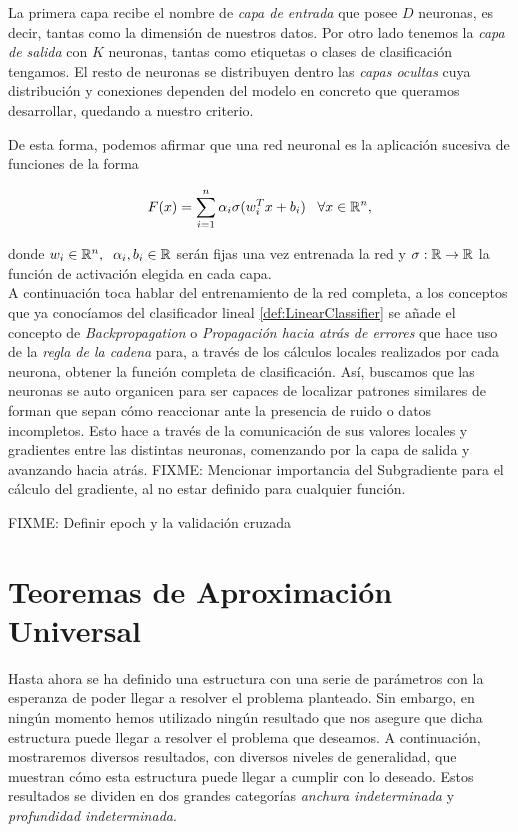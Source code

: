 La primera capa recibe el nombre de \emph{capa de entrada} que posee $D$ neuronas, es decir, tantas como la dimensión de nuestros datos. Por otro lado tenemos la \emph{capa de salida} con $K$ neuronas, tantas como etiquetas o clases de clasificación tengamos. El resto de neuronas se distribuyen dentro las \emph{capas ocultas} cuya distribución y conexiones dependen del modelo en concreto que queramos desarrollar, quedando a nuestro criterio.\newline

De esta forma, podemos afirmar que una red neuronal es la aplicación sucesiva de funciones de la forma

$$F(x)=\sum_{i=1}^n \alpha_i \sigma(w_i^Tx+b_i) \;\;\; \forall x \in \mathbb{R}^n,$$

donde $w_i\in\mathbb{R}^n,\;\; \alpha_i,b_i\in\mathbb{R}$ serán fijas una vez entrenada la red y $\sigma : \mathbb{R} \to \mathbb{R}$ la función de activación elegida en cada capa.\\

A continuación toca hablar del entrenamiento de la red completa, a los conceptos que ya conocíamos del clasificador lineal \ref{def:LinearClassifier} se añade el concepto de \emph{Backpropagation} o \emph{Propagación hacia atrás de errores} que hace uso de la \emph{regla de la cadena} para, a través de los cálculos locales realizados por cada neurona, obtener la función completa de clasificación. Así, buscamos que las neuronas se auto organicen para ser capaces de localizar patrones similares de forman que sepan cómo reaccionar ante la presencia de ruido o datos incompletos. Esto hace a través de la comunicación de sus valores locales y gradientes entre las distintas neuronas, comenzando por la capa de salida y avanzando hacia atrás. FIXME: Mencionar importancia del Subgradiente para el cálculo del gradiente, al no estar definido para cualquier función. \newline

FIXME: Definir epoch y la validación cruzada

\chapter{Teoremas de Aproximación Universal}
Hasta ahora se ha definido una estructura con una serie de parámetros con la esperanza de poder llegar a resolver el problema planteado. Sin embargo, en ningún momento hemos utilizado ningún resultado que nos asegure que dicha estructura puede llegar a resolver el problema que deseamos. A continuación, mostraremos diversos resultados, con diversos niveles de generalidad, que muestran cómo esta estructura puede llegar a cumplir con lo deseado. Estos resultados se dividen en dos grandes categorías \emph{anchura indeterminada} y \emph{profundidad indeterminada}.

